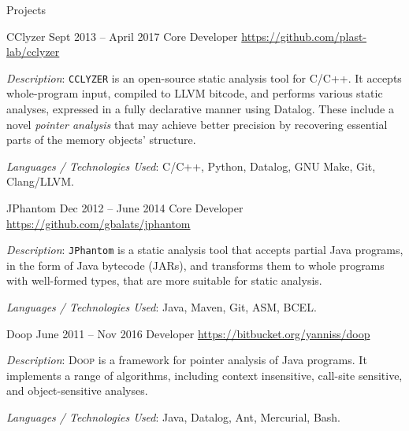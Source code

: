 \documentclass{resume}
\begin{document}
\begin{rSection}{Projects}
  \begin{rSubsection}
    {CClyzer}
    {Sept 2013 -- April 2017}
    {Core Developer}
    {\url{https://github.com/plast-lab/cclyzer}}
  \item \emph{Description}: \texttt{CCLYZER} is an open-source static
    analysis tool for C/C++. It accepts whole-program input, compiled
    to LLVM bitcode, and performs various static analyses, expressed
    in a fully declarative manner using Datalog. These include a novel
    \emph{pointer analysis} that may achieve better precision by
    recovering essential parts of the memory objects' structure.
    \vspace{0.3em}
  \item \emph{Languages / Technologies Used}: C/C++, Python, Datalog,
    GNU Make, Git, Clang/LLVM.
  \end{rSubsection}

  \begin{rSubsection}
    {JPhantom}
    {Dec 2012 -- June 2014}
    {Core Developer}
    {\url{https://github.com/gbalats/jphantom}}
  \item \emph{Description}: \texttt{JPhantom} is a static analysis
    tool that accepts partial Java programs, in the form of Java
    bytecode (JARs), and transforms them to whole programs with
    well-formed types, that are more suitable for static analysis.
    \vspace{0.3em}
  \item \emph{Languages / Technologies Used}: Java, Maven, Git, ASM, BCEL.
  \end{rSubsection}

  \begin{rSubsection}
    {Doop}
    {June 2011 -- Nov 2016}
    {Developer}
    {\url{https://bitbucket.org/yanniss/doop}}
  \item \emph{Description}: \textsc{Doop} is a framework for pointer
    analysis of Java programs. It implements a range of algorithms,
    including context insensitive, call-site sensitive, and
    object-sensitive analyses.
    \vspace{0.3em}
  \item \emph{Languages / Technologies Used}: Java, Datalog, Ant,
    Mercurial, Bash.
  \end{rSubsection}
\end{rSection}
\end{document}
